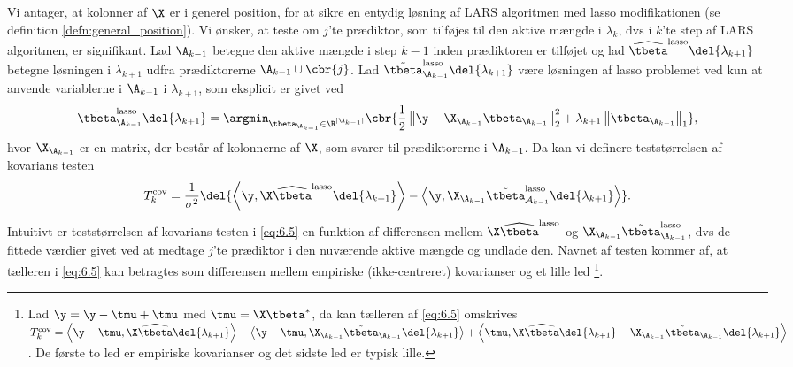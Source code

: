 Vi antager, at kolonner af \(\X\) er i generel position, for at sikre en entydig løsning af LARS algoritmen med lasso modifikationen (se definition \ref{defn:general_position}).
%
Vi ønsker, at teste om \(j\)'te prædiktor, som tilføjes til den aktive mængde i \(\lambda_k\), dvs i \(k\)'te step af LARS algoritmen, er signifikant.
Lad \(\A_{k-1}\) betegne den aktive mængde i step \(k-1\) inden prædiktoren er tilføjet og lad \(\widehat{\tbeta}^\text{lasso} \del{\lambda_{k+1}}\) betegne løsningen i \(\lambda_{k+1}\) udfra prædiktorerne \(\A_{k-1} \cup \cbr{j}\).
Lad \(\tilde{\tbeta}^\text{lasso}_{\A_{k-1}} \del{\lambda_{k+1}}\) være løsningen af lasso problemet ved kun at anvende variablerne i \(\A_{k-1}\) i \(\lambda_{k+1}\), som eksplicit er givet ved 
\begin{align*}
\tilde{\tbeta}^\text{lasso}_{\A_{k-1}} \del{\lambda_{k+1}} = \argmin_{\tbeta_{\A_{k-1}} \in \R^{\vert \A_{k-1} \vert}} \cbr{\frac{1}{2} \left\Vert \y - \X_{\A_{k-1}} \tbeta_{\A_{k-1}} \right\Vert_2^2 + \lambda_{k+1} \left\Vert \tbeta_{\A_{k-1}} \right\Vert_1},
\end{align*}
hvor \(\X_{\A_{k-1}}\) er en matrix, der består af kolonnerne af \(\X\), som svarer til prædiktorerne i \(\A_{k-1}\).
Da kan vi definere teststørrelsen af kovarians testen
\begin{align}
T_k^\text{cov} = \frac{1}{\sigma^2} \del{ \left\langle \y, \X \widehat{\tbeta}^\text{lasso} \del{\lambda_{k+1}} \right\rangle - \left\langle  \y, \X_{\A_{k-1}} \tilde{\tbeta}^\text{lasso}_{\mathcal{A}_{k-1}} \del{\lambda_{k+1}} \right\rangle}. \label{eq:6.5}
\end{align}
Intuitivt er teststørrelsen af kovarians testen i \eqref{eq:6.5} en funktion af differensen mellem \(\X \widehat{\tbeta}^\text{lasso}\) og \(\X_{\A_{k-1}} \tilde{\tbeta}^\text{lasso}_{\A_{k-1}}\), dvs de fittede værdier givet ved at medtage \(j\)'te prædiktor i den nuværende aktive mængde og undlade den.
Navnet af testen kommer af, at tælleren i \eqref{eq:6.5} kan betragtes som differensen mellem empiriske (ikke-centreret) kovarianser og et lille led 
\footnote{Lad \(\y = \y - \tmu + \tmu\) med \(\tmu = \X \tbeta^*\), da kan tælleren af \eqref{eq:6.5} omskrives \(T_k^\text{cov} = \left\langle \y - \tmu, \X \widehat{\tbeta} \del{\lambda_{k+1}} \right\rangle - \left\langle \y - \tmu, \X_{\A_{k-1}} \tilde{\tbeta}_{\A_{k-1}} \del{\lambda_{k+1}} \right\rangle + \left\langle \tmu, \X \widehat{\tbeta} \del{\lambda_{k+1}} - \X_{\A_{k-1}} \tilde{\tbeta}_{\A_{k-1}} \del{\lambda_{k+1}} \right\rangle\).
De første to led er empiriske kovarianser og det sidste led er typisk lille.}.

